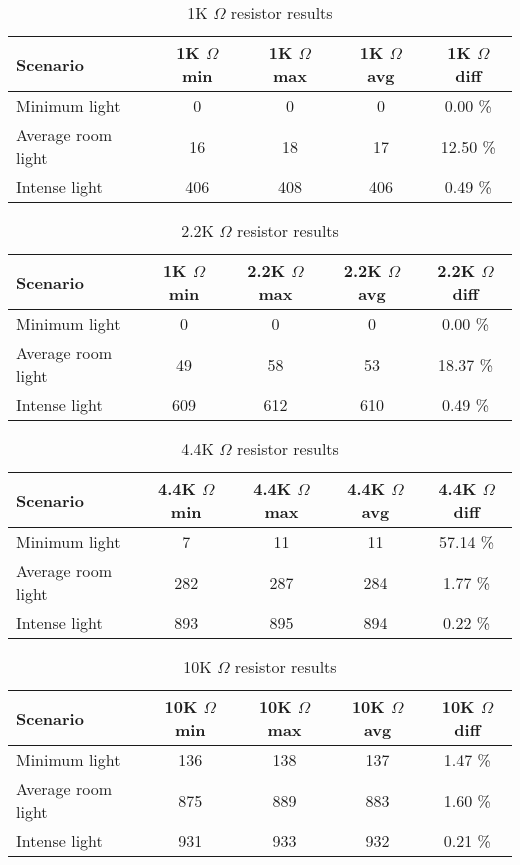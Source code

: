 \begin{table}[H]
  \centering
  \begin{tabular}{l c c c c}
    Scenario & 1K $\Omega$ min & 1K $\Omega$ max & 1K $\Omega$ avg & 1K $\Omega$ diff \\
    \hline
    Minimum light & 0 & 0 & 0 & 0.00 \% \\
    Average room light & 16 & 18 & 17 & 12.50 \% \\
    Intense light & 406 & 408 & 406 & 0.49 \% \\
  \end{tabular}
  \caption{1K $\Omega$ resistor results}\label{tab:1KTestResults}
\end{table}

\begin{table}[H]
  \centering
  \begin{tabular}{l c c c c}
    Scenario & 1K $\Omega$ min & 2.2K $\Omega$ max & 2.2K $\Omega$ avg & 2.2K $\Omega$ diff \\
    \hline
    Minimum light & 0 & 0 & 0 & 0.00 \% \\
    Average room light & 49 & 58 & 53 & 18.37 \% \\
    Intense light & 609 & 612 & 610 & 0.49 \% \\
  \end{tabular}
  \caption{2.2K $\Omega$ resistor results}\label{tab:2.2KTestResults}
\end{table}

\begin{table}[H]
  \centering
  \begin{tabular}{l c c c c}
    Scenario & 4.4K $\Omega$ min & 4.4K $\Omega$ max & 4.4K $\Omega$ avg & 4.4K $\Omega$ diff \\
    \hline
    Minimum light & 7 & 11 & 11 & 57.14 \% \\
    Average room light & 282 & 287 & 284 & 1.77 \% \\
    Intense light & 893 & 895 & 894 & 0.22 \% \\
  \end{tabular}
  \caption{4.4K $\Omega$ resistor results}\label{tab:4.4KTestResults}
\end{table}

\begin{table}[H]
  \centering
  \begin{tabular}{l c c c c}
    Scenario & 10K $\Omega$ min & 10K $\Omega$ max & 10K $\Omega$ avg & 10K $\Omega$ diff \\
    \hline
    Minimum light & 136 & 138 & 137 & 1.47 \% \\
    Average room light & 875 & 889 & 883 & 1.60 \% \\
    Intense light & 931 & 933 & 932 & 0.21 \% \\
  \end{tabular}
  \caption {10K $\Omega$ resistor results}\label{tab:10KTestResults}
\end{table}

